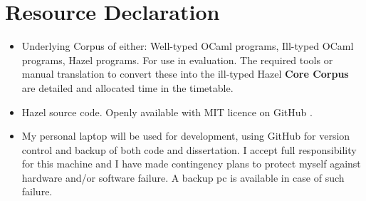 \section{Resource Declaration}
\begin{itemize}
\item Underlying Corpus of either: Well-typed OCaml programs, Ill-typed OCaml programs, Hazel programs. For use in evaluation. The required tools or manual translation to convert these into the ill-typed Hazel \textbf{Core Corpus} are detailed and allocated time in the timetable.

\item Hazel source code. Openly available with MIT licence on GitHub \cite{HazelCode}.

\item My personal laptop will be used for development, using GitHub for version control and backup of both code and dissertation. I accept full responsibility for this machine and I have made contingency plans to protect myself against hardware and/or software failure. A backup pc is available in case of such failure.

\end{itemize}